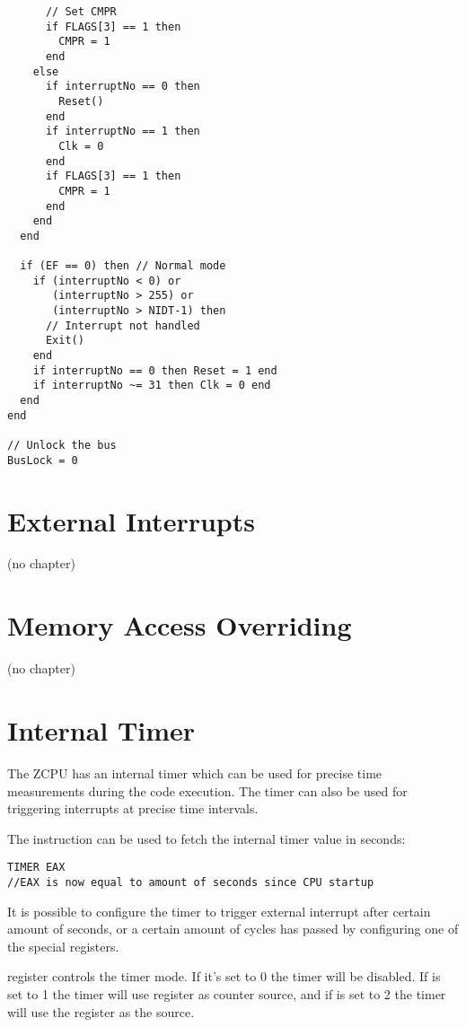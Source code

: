 \begin{verbatim}
      // Set CMPR
      if FLAGS[3] == 1 then
        CMPR = 1
      end
    else
      if interruptNo == 0 then
        Reset()
      end
      if interruptNo == 1 then
        Clk = 0
      end
      if FLAGS[3] == 1 then
        CMPR = 1
      end
    end
  end

  if (EF == 0) then // Normal mode
    if (interruptNo < 0) or 
       (interruptNo > 255) or 
       (interruptNo > NIDT-1) then
      // Interrupt not handled
      Exit()
    end
    if interruptNo == 0 then Reset = 1 end
    if interruptNo ~= 31 then Clk = 0 end
  end
end
  
// Unlock the bus
BusLock = 0
\end{verbatim}
\onehalfspacing

\section{External Interrupts}
(no chapter)

\section{Memory Access Overriding} \label{memoverride}
(no chapter)

\section{Internal Timer}
The ZCPU has an internal timer which can be used for precise time measurements during the code execution. The timer can also be used for triggering interrupts at precise time intervals.

The  instruction can be used to fetch the internal timer value in seconds:
\begin{verbatim}
TIMER EAX
//EAX is now equal to amount of seconds since CPU startup
\end{verbatim}

It is possible to configure the timer to trigger external interrupt after certain amount of seconds, or a certain amount of cycles has passed by configuring one of the special registers.

 register controls the timer mode. If it's set to 0 the timer will be disabled. If  is set to 1 the timer will use  register as counter source, and if  is set to 2 the timer will use the  register as the source.

